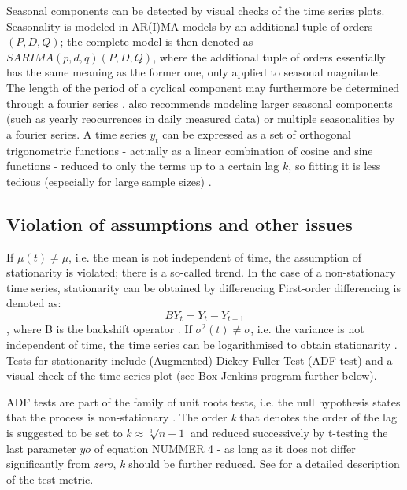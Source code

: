 \documentclass[a4paper, 11pt]{article}
\begin{document}
Seasonal components can be detected by visual checks of the time series plots.
Seasonality is modeled in AR(I)MA models by an additional tuple of orders $(P,D,Q)$; the complete model is then denoted as $SARIMA(p,d,q)(P,D,Q)$, where the additional tuple of orders essentially has the same meaning as the former one, only applied to seasonal magnitude.  
\\The length of the period of a cyclical component may furthermore be determined through a fourier series \citep{Vogel.2015}.
\cite{Hyndman.2008} also recommends modeling larger seasonal components (such as yearly reocurrences in daily measured data) or multiple seasonalities by a fourier series.
A time series $y_{t}$ can be expressed as a set of orthogonal trigonometric functions - actually as a linear combination of cosine and sine functions -  reduced to only the terms up to a certain lag $k$, so fitting it is less tedious (especially for large sample sizes) \cite{Iwok.2016}. 

\subsection{Violation of assumptions and other issues}
If $\mu(t) \neq \mu$, i.e. the mean is not independent of time, the assumption of stationarity is violated; there is a so-called trend. In the case of a non-stationary time series, stationarity can be obtained by differencing \citep{Andreoni.2006b, Hunt.2003}
First-order differencing is denoted as:
\begin{equation}
BY_{t} = Y_{t} - Y_{t-1}
\end{equation}
, where B is the backshift operator \citep{Hunt.2003}.
If $\sigma^2(t) \neq \sigma$, i.e. the variance is not independent of time, the time series can be logarithmised to obtain stationarity \citep{Andreoni.2006b}.
Tests for stationarity include (Augmented) Dickey-Fuller-Test (ADF test) \citep{Zhao.07022018} and a visual check of the time series plot (see Box-Jenkins program further below). 

ADF tests are part of the family of unit roots tests, i.e. the null hypothesis states that the process is non-stationary \citep{Zhao.07022018}. The order \textit{k} that denotes the order of the lag is suggested to be set to $k \approx \sqrt[3]{n-1}$ and reduced successively by t-testing the last parameter $yo$ of equation NUMMER 4 - as long as it does not differ significantly from \textit{zero}, \textit{k} should be further reduced. See \cite{Vogel.2015} for a detailed description of the test metric.
\end{document}
